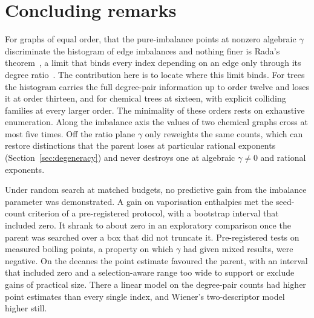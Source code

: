 \documentclass[a5paper, 10pt]{article}
\theoremstyle{plain}
\theoremstyle{remark}
\theoremstyle{definition}
\begin{document}
\section{Concluding remarks}\label{sec:limitations}\label{sec:conclusion}

For graphs of equal order, that the pure-imbalance points at nonzero
algebraic $\gamma$ discriminate the histogram of edge imbalances and
nothing finer is Rada's theorem~\cite[Theorem~3.4]{Rada2019ExpVDB}, a limit
that binds every index depending on an edge only through its degree
ratio~\cite[Proposition~2.5]{Rada2019ExpVDB}. The contribution here is
to locate where this limit binds. For trees the histogram carries the
full degree-pair information up to order twelve and loses it at order
thirteen, and for chemical trees at sixteen, with explicit colliding
families at every larger order. The minimality of these orders rests on
exhaustive enumeration. Along the imbalance
axis the values of two chemical graphs cross at most five times. Off the ratio
plane $\gamma$ only reweights the same counts, which can restore
distinctions that the parent loses at particular rational exponents
(Section~\ref{sec:degeneracy}) and never destroys one at algebraic
$\gamma \neq 0$ and rational exponents.

Under random search at matched budgets, no predictive gain from the
imbalance parameter was demonstrated. A gain on vaporisation enthalpies met the seed-count criterion of
a pre-registered protocol, with a bootstrap interval that included zero.
It shrank to about zero in an exploratory comparison once the parent was
searched over a box that did not truncate it. Pre-registered tests on
measured boiling points, a property on which $\gamma$ had given mixed
results, were negative. On the decanes the point estimate
favoured the parent, with an interval that included zero and a
selection-aware range too wide to support or exclude gains of practical
size. There a linear model on the degree-pair counts had higher point
estimates than every single index, and Wiener's two-descriptor model
higher still.
\end{document}
